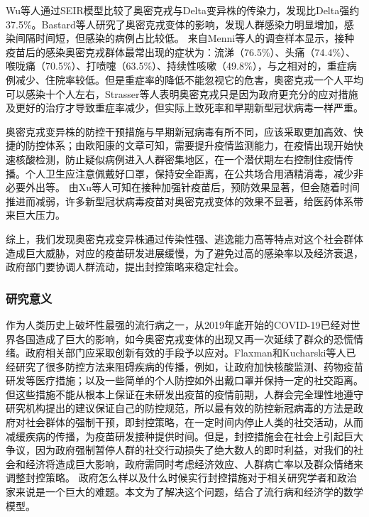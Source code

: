 Wu\cite{wu2022epidemiologic}等人通过SEIR模型比较了奥密克戎与Delta变异株的传染力，发现比Delta强约37.5\%。Bastard\cite{bastard2022impact}等人研究了奥密克戎变体的影响，发现人群感染力明显增加，感染间隔时间短，但感染的病例占比较低。
来自Menni\cite{menni2022symptom}等人的调查样本显示，接种疫苗后的感染奥密克戎群体最常出现的症状为：流涕（76.5\%）、头痛（74.4\%）、喉咙痛（70.5\%）、打喷嚏（63.5\%）、持续性咳嗽（49.8\%），与之相对的，重症病例减少、住院率较低。但是重症率的降低不能忽视它的危害，奥密克戎一个人平均可以感染十个人左右，Strasser\cite{strasser2022sars}等人表明奥密克戎只是因为政府更充分的应对措施及更好的治疗才导致重症率减少，但实际上致死率和早期新型冠状病毒一样严重。

奥密克戎变异株的防控干预措施与早期新冠病毒有所不同，应该采取更加高效、快捷的防控体系；由欧阳康\cite{欧阳康2022新冠肺炎病毒变异传播背景下的疫情精准防控体系研究}的文章可知，需要提升疫情监测能力，在疫情出现开始快速核酸检测，防止疑似病例进入人群密集地区，在一个潜伏期左右控制住疫情传播。个人卫生应注意佩戴好口罩，保持安全距离，在公共场合用酒精消毒，减少非必要外出等。
由Xu\cite{xu2022protective}等人可知在接种加强针疫苗后，预防效果显著，但会随着时间推进而减弱，许多新型冠状病毒疫苗对奥密克戎变体的效果不显著，给医药体系带来巨大压力。

综上，我们发现奥密克戎变异株通过传染性强、逃逸能力高等特点对这个社会群体造成巨大威胁，对应的疫苗研发进展缓慢，为了避免过高的感染率以及经济衰退，政府部门要协调人群流动，提出封控策略来稳定社会。

\subsubsection{研究意义}

作为人类历史上破坏性最强的流行病之一，从2019年底开始的COVID-19已经对世界各国造成了巨大的影响，如今奥密克戎变体的出现又再一次延续了群众的恐慌情绪。政府相关部门应采取创新有效的手段予以应对。Flaxman\cite{flaxman2020estimating}和Kucharski\cite{kucharski2020early}等人已经研究了很多防控方法来阻碍疾病的传播，例如，让政府加快核酸监测、药物疫苗研发等医疗措施；以及一些简单的个人防控如外出戴口罩并保持一定的社交距离。
但这些措施不能从根本上保证在未研发出疫苗的疫情前期，人群会完全理性地遵守研究机构提出的建议保证自己的防控规范，所以最有效的防控新冠病毒的方法是政府对社会群体的强制干预，即封控策略，在一定时间内停止人类的社交活动，从而减缓疾病的传播，为疫苗研发接种提供时间。但是，封控措施会在社会上引起巨大争议，因为政府强制暂停人群的社交行动损失了绝大数人的即时利益，对我们的社会和经济将造成巨大影响，政府需同时考虑经济效应、人群病亡率以及群众情绪来调整封控策略。
政府怎么样以及什么时候实行封控措施对于相关研究学者和政治家来说是一个巨大的难题。本文为了解决这个问题，结合了流行病和经济学的数学模型。

